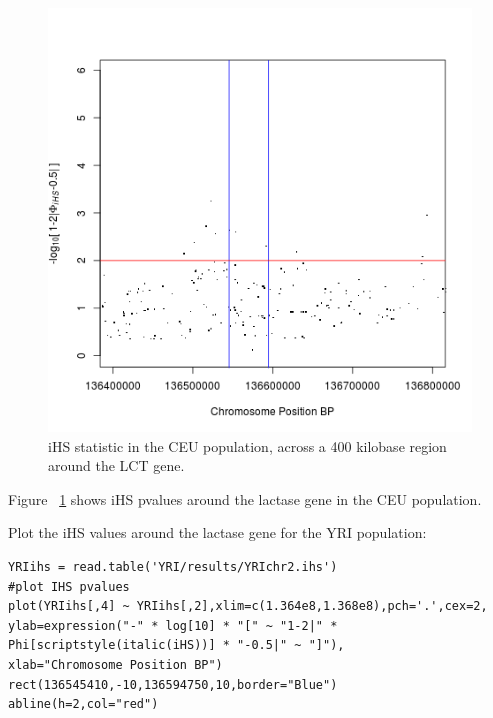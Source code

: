 \documentclass[a4paper,10pt]{article}
\begin{document}
\begin{figure}
\centering
\includegraphics{pictures/CEUihs.png}
\caption{iHS statistic in the CEU population, across a 400 kilobase region around the LCT gene. }  
\label{fig:ceuihs}
\end{figure}

\noindent
Figure ~\ref{fig:ceuihs} shows iHS pvalues around the lactase gene in the CEU population.

\noindent
Plot the iHS values around the lactase gene for the YRI population:\\
\begin{verbatim}
YRIihs = read.table('YRI/results/YRIchr2.ihs')
#plot IHS pvalues
plot(YRIihs[,4] ~ YRIihs[,2],xlim=c(1.364e8,1.368e8),pch='.',cex=2,
ylab=expression("-" * log[10] * "[" ~ "1-2|" * Phi[scriptstyle(italic(iHS))] * "-0.5|" ~ "]"),
xlab="Chromosome Position BP") 
rect(136545410,-10,136594750,10,border="Blue") 
abline(h=2,col="red")
\end{verbatim}
\end{document}
